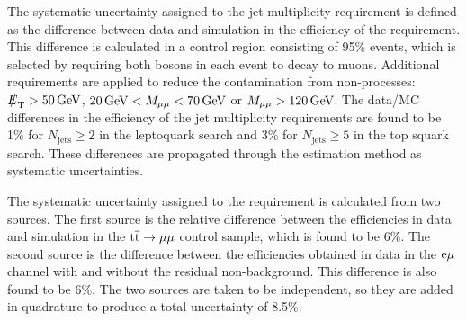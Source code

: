 The systematic uncertainty assigned to the jet multiplicity requirement is defined as the difference between data and simulation in the efficiency of the requirement. This difference is calculated in a control region consisting of 95\% \ttbar events, which is selected by requiring both \W bosons in each event to decay to muons. Additional requirements are applied to reduce the contamination from non-\ttbar processes: $\met > 50\GeV$, $20\,\text{Ge\hspace{-.08em}V} < M_{\mu\mu} < 70\,\text{Ge\hspace{-.08em}V}$ or $M_{\mu\mu} > 120\,\text{Ge\hspace{-.08em}V}$. The data/MC differences in the efficiency of the jet multiplicity requirements are found to be 1\% for $N_{\text{jets}}\geq2$ in the leptoquark search and 3\% for $N_{\text{jets}}\geq5$ in the top squark search. These differences are propagated through the \ttbar estimation method as systematic uncertainties.

The systematic uncertainty assigned to the \MassTJ requirement is calculated from two sources. The first source is the relative difference between the efficiencies in data and simulation in the $\mathrm{t}\overline{\mathrm{t}} \rightarrow \mu\mu$ control sample, which is found to be 6\%. The second source is the difference between the efficiencies obtained in data in the $\mathrm{e}\mu$ channel with and without the residual non-\ttbar background. This difference is also found to be 6\%. The two sources are taken to be independent, so they are added in quadrature to produce a total uncertainty of 8.5\%.

